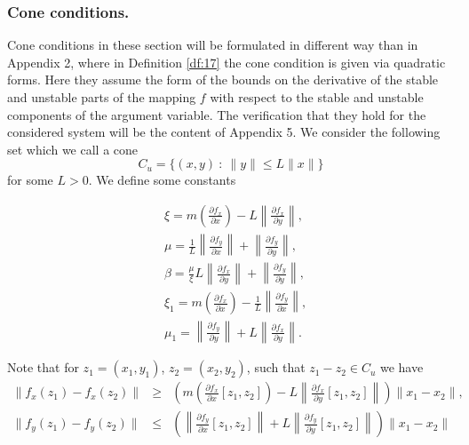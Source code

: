 \documentclass[11pt, leqno]{amsart}
\theoremstyle{definition}
\begin{document}
\subsubsection{Cone conditions.} Cone conditions in these section will be formulated in different way than in Appendix 2, where in Definition \ref{df:17} the cone condition is given via quadratic forms. Here they assume the form of the bounds on the derivative of the stable and unstable parts of the mapping $f$ with respect to the stable and unstable components of the argument variable. The verification that they hold for the considered system will be the content of  Appendix 5. We consider the following set which we call a cone 
\begin{equation}
	C_u=\{ (x,y) \ : \  \|y\| \leq L \|x\| \}
\end{equation}
for some $L>0$. We define some constants

\begin{align}
	  &\xi= m\left(\frac{\partial f_x}{\partial x} \right) - L\left\|\frac{\partial f_x}{\partial y} \right\|, \label{eq:xi} \\
	&\mu=\frac{1}{L}\left\|\frac{\partial f_y}{\partial x}\right\|  +  \left\|\frac{\partial f_y}{\partial y} \right\|  \label{eq:mu},\\
	&\beta = \frac{\mu}{\xi} L \left\|\frac{\partial f_x}{\partial y}\right\|  +  \left\|\frac{\partial f_y}{\partial y} \right\|,  \label{eq:beta} \\
	& \xi_1 = m\left( \frac{\partial f_x}{\partial x}\right) -\frac{1}{L} \left\|\frac{\partial f_y}{\partial x}\right\|, \label{eq:xi1} \\
	&\mu_1 =   \left\|\frac{\partial f_y}{\partial y}\right\| + L \left\|\frac{\partial f_x}{\partial y}\right\| . \label{eq:mu1}
\end{align}



Note that for $z_1=(x_1,y_1)$, $z_2=(x_2,y_2)$, such that $z_1 - z_2 \in C_u$ we have
\begin{eqnarray}
  \|f_x(z_1) - f_x(z_2)\| &\geq& \left(m\left(\frac{\partial f_x}{\partial x}[z_1,z_2] \right) - L\left\|\frac{\partial f_x}{\partial y}[z_1,z_2] \right\|\right) \|x_1 - x_2\|, \label{eq:dfx} \\
  \|f_y(z_1) - f_y(z_2)\| &\leq& \left(\left\|\frac{\partial f_y}{\partial x}[z_1,z_2]\right\|  +  L\left\|\frac{\partial f_y}{\partial y}[z_1,z_2] \right\| \right) \|x_1 - x_2\|
  \label{eq:dfy}
\end{eqnarray}
\end{document}
